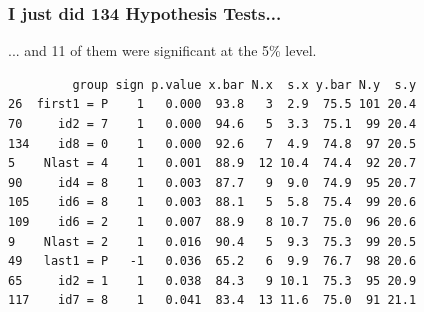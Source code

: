 \documentclass[handout]{beamer}
\begin{document}
\begin{frame}[c,fragile]\frametitle{I just did 134 Hypothesis Tests...}
   
 \begin{block}
 	{... and 11 of them were significant at the 5\% level.}
 \end{block}

\footnotesize

\begin{verbatim}
         group sign p.value x.bar N.x  s.x y.bar N.y  s.y
26  first1 = P    1   0.000  93.8   3  2.9  75.5 101 20.4
70     id2 = 7    1   0.000  94.6   5  3.3  75.1  99 20.4
134    id8 = 0    1   0.000  92.6   7  4.9  74.8  97 20.5
5    Nlast = 4    1   0.001  88.9  12 10.4  74.4  92 20.7
90     id4 = 8    1   0.003  87.7   9  9.0  74.9  95 20.7
105    id6 = 8    1   0.003  88.1   5  5.8  75.4  99 20.6
109    id6 = 2    1   0.007  88.9   8 10.7  75.0  96 20.6
9    Nlast = 2    1   0.016  90.4   5  9.3  75.3  99 20.5
49   last1 = P   -1   0.036  65.2   6  9.9  76.7  98 20.6
65     id2 = 1    1   0.038  84.3   9 10.1  75.3  95 20.9
117    id7 = 8    1   0.041  83.4  13 11.6  75.0  91 21.1
\end{verbatim}
\end{frame}
\end{document}
